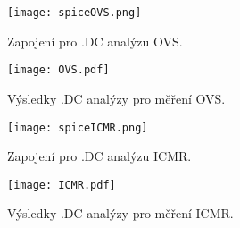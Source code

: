 \begin{figure}[h!]
    \centering
    \texttt{[image: spiceOVS.png]}
    \caption{Zapojení pro .DC analýzu OVS.}
    \label{fig:spiceOVS.png}
\end{figure}

\begin{figure}[h!]
    \centering
    \texttt{[image: OVS.pdf]}
    \caption{Výsledky .DC analýzy pro měření OVS.}
    \label{fig:OVS.pdf}
\end{figure}

\begin{figure}[h!]
    \centering
    \texttt{[image: spiceICMR.png]}
    \caption{Zapojení pro .DC analýzu ICMR.}
    \label{fig:spiceICMR.png}
\end{figure}

\begin{figure}[h!]
    \centering
    \texttt{[image: ICMR.pdf]}
    \caption{Výsledky .DC analýzy pro měření ICMR.}
    \label{fig:OVS.pdf}
\end{figure}


